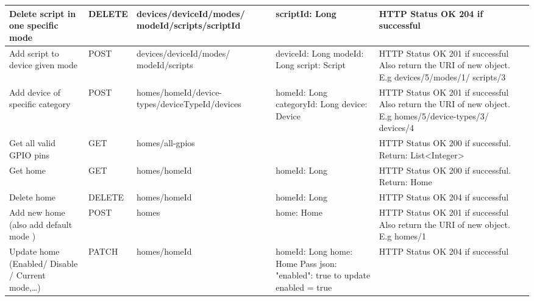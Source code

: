 \documentclass[12pt,a4paper,oneside]{extbook}
\begin{document}
{\begin{longtable}{|>{\raggedright\arraybackslash}p{2.2cm}|p{1.2cm}|p{3.3cm}|p{3cm}|>{\raggedright\arraybackslash}p{4.3cm}|}
\hline\Tstrut
Delete script in one specific mode &	DELETE &	devices/{deviceId}/modes/
{modeId}/scripts/{scriptId} &	scriptId: Long &	HTTP Status OK 204 if successful\\

\hline\Tstrut
Add script to device given mode &	POST &	devices/{deviceId}/modes/
{modeId}/scripts &	deviceId: Long\newline
modeId: Long\newline
script: Script &	
HTTP Status OK 201 if successful\newline
Also return the URI of new object.\newline
E.g devices/5/modes/1/\newline
scripts/3\\

\hline\Tstrut
Add device of specific category &	POST &	homes/{homeId}/device-types/{deviceTypeId}/\newline devices &	
homeId: Long\newline
categoryId: Long\newline
device: Device	& 
HTTP Status OK 201 if successful\newline
Also return the URI of new object. \newline
E.g\newline
homes/5/device-types/3/\newline
devices/4\\

\hline\Tstrut
Get all valid GPIO pins	& GET &	homes/all-gpios & &		
HTTP Status OK 200 if successful.\newline
Return: List<Integer>\\

\hline\Tstrut
Get home &	GET	& homes/{homeId} &	homeId: Long &	
HTTP Status OK 200 if successful.\newline
Return: Home\\

\hline\Tstrut
Delete home	& DELETE &	homes/{homeId} &	homeId: Long	& HTTP Status OK 204 if successful\\

\hline\Tstrut
Add new home (also add default mode ) &	POST &	homes &	
home: Home &
HTTP Status OK 201 if successful\newline
Also return the URI of new object. \newline
E.g\newline
homes/1\\

\hline\Tstrut
Update home (Enabled/ Disable / Current mode,\dots)	& PATCH	& homes/{homeId} &	
homeId: Long\newline
home: Home\newline
Pass json: {"enabled": true}
to update enabled = true &	HTTP Status OK 204 if successful\\


\end{longtable}}
\end{document}
